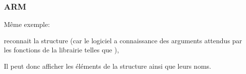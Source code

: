 ﻿\subsubsection{ARM}

\myparagraph{\OptimizingKeilVI (\ThumbMode)}

Même exemple:



\myparagraph{\OptimizingXcodeIV (\ThumbTwoMode)}

\IDA reconnait la structure  (car le logiciel a connaissance des arguments attendus par les 
fonctions de la librairie telles que ), 

Il peut donc afficher les éléments de la structure ainsi que leurs noms.


